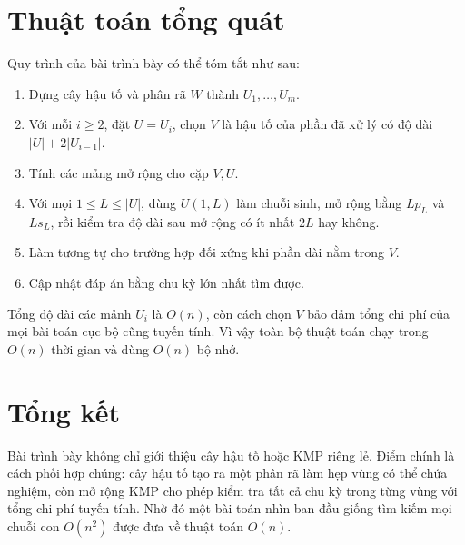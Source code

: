 \documentclass[11pt]{article}
\begin{document}
\section{Thuật toán tổng quát}

Quy trình của bài trình bày có thể tóm tắt như sau:
\begin{enumerate}
  \item Dựng cây hậu tố và phân rã \(W\) thành \(U_1,\ldots,U_m\).
  \item Với mỗi \(i\ge2\), đặt \(U=U_i\), chọn \(V\) là hậu tố của phần đã xử
        lý có độ dài \(|U|+2|U_{i-1}|\).
  \item Tính các mảng mở rộng cho cặp \(V,U\).
  \item Với mọi \(1\le L\le |U|\), dùng \(U(1,L)\) làm chuỗi sinh, mở rộng
        bằng \(\mathit{Lp}_L\) và \(\mathit{Ls}_L\), rồi kiểm tra độ dài sau
        mở rộng có ít nhất \(2L\) hay không.
  \item Làm tương tự cho trường hợp đối xứng khi phần dài nằm trong \(V\).
  \item Cập nhật đáp án bằng chu kỳ lớn nhất tìm được.
\end{enumerate}

Tổng độ dài các mảnh \(U_i\) là \(O(n)\), còn cách chọn \(V\) bảo đảm tổng
chi phí của mọi bài toán cục bộ cũng tuyến tính. Vì vậy toàn bộ thuật toán
chạy trong \(O(n)\) thời gian và dùng \(O(n)\) bộ nhớ.

\section{Tổng kết}

Bài trình bày không chỉ giới thiệu cây hậu tố hoặc KMP riêng lẻ. Điểm chính
là cách phối hợp chúng: cây hậu tố tạo ra một phân rã làm hẹp vùng có thể chứa
nghiệm, còn mở rộng KMP cho phép kiểm tra tất cả chu kỳ trong từng vùng với
tổng chi phí tuyến tính. Nhờ đó một bài toán nhìn ban đầu giống tìm kiếm
mọi chuỗi con \(O(n^2)\) được đưa về thuật toán \(O(n)\).
\end{document}
